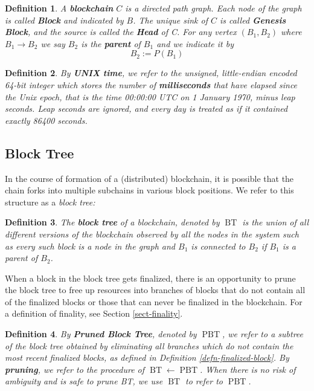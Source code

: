 \documentclass{book}
\newcommand{\assign}{:=}
\newcommand{\tmem}[1]{{\em #1\/}}
\newcommand{\tmop}[1]{\ensuremath{\operatorname{#1}}}
\newcommand{\tmstrong}[1]{\textbf{#1}}
\newcommand{\tmtextbf}[1]{{\bfseries{#1}}}
\newcommand{\tmtextit}[1]{{\itshape{#1}}}
\newtheorem{definition}{Definition}
\providecommand{\tmem}[1]{\tmtextit{#1}}
\providecommand{\tmop}[1]{\ensuremath{\mathrm{#1}}}
\providecommand{\tmstrong}[1]{\tmtextbf{#1}}
\providecommand{\tmtextbf}[1]{\tmtextbf{#1}}
\providecommand{\tmtextit}[1]{\tmtextit{#1}}
\newtheorem{definition}{Definition}
\begin{document}
\begin{definition}
  A \label{autolab6}{\tmstrong{blockchain}} $C$ is a directed path graph. Each
  node of the graph is called \label{autolab7}{\tmstrong{Block}} and indicated
  by {\tmstrong{$B$}}. The unique sink of $C$ is called
  \label{autolab8}{\tmstrong{Genesis Block}}, and the source is called the
  \label{autolab9}{\tmstrong{Head}} of C. For any vertex $(B_1, B_2)$ where
  $B_1 \rightarrow B_2$ we say $B_2$ is the
  \label{autolab10}{\tmstrong{parent}} of $B_1$ and we indicate it by
  \[ B_2 \assign P (B_1) \]
\end{definition}

\begin{definition}
  \label{defn-unix-time}By {\tmstrong{UNIX time}}, we refer to the unsigned,
  little-endian encoded 64-bit integer which stores the number of
  {\tmstrong{milliseconds}} that have elapsed since the Unix epoch, that is
  the time 00:00:00 UTC on 1 January 1970, minus leap seconds. Leap seconds
  are ignored, and every day is treated as if it contained exactly 86400
  seconds.
\end{definition}

\subsection{Block Tree}

In the course of formation of a (distributed) blockchain, it is possible that
the chain forks into multiple subchains in various block positions. We refer
to this structure as a {\tmem{block tree:}}

\begin{definition}
  \label{defn-block-tree}The \label{autolab11}{\tmstrong{block tree}} of a
  blockchain, denoted by $\tmop{BT}$ is the union of all different versions of
  the blockchain observed by all the nodes in the system such as every such
  block is a node in the graph and $B_1$ is connected to $B_2$ if $B_1$ is a
  parent of $B_2$.
\end{definition}

When a block in the block tree gets finalized, there is an opportunity to
prune the block tree to free up resources into branches of blocks that do not
contain all of the finalized blocks or those that can never be finalized in
the blockchain. For a definition of finality, see Section \ref{sect-finality}.

\begin{definition}
  \label{defn-pruned-tree}By \label{autolab12}{\tmstrong{Pruned Block Tree}},
  denoted by $\tmop{PBT}$, we refer to a subtree of the block tree obtained by
  eliminating all branches which do not contain the most recent finalized
  blocks, as defined in Definition \ref{defn-finalized-block}. By
  \label{autolab13}{\tmstrong{pruning}}, we refer to the procedure of
  $\tmop{BT} \leftarrow \tmop{PBT}$. When there is no risk of ambiguity and is
  safe to prune BT, we use $\tmop{BT}$ to refer to $\tmop{PBT}$.
\end{definition}
\end{document}

